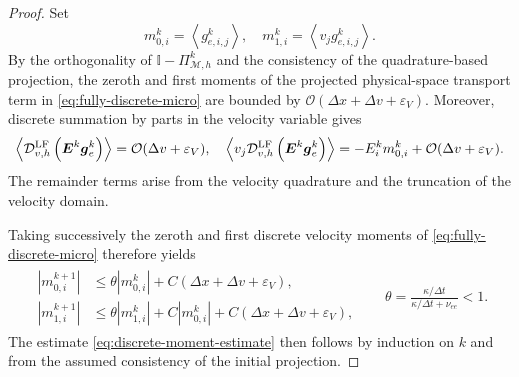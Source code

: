 \documentclass[pdflatex,final,10pt]{article}
\newcommand{\Del}[1]{#1}
\begin{document}
\begin{proof}
Set
\begin{equation*}
    m_{0,i}^{k}
    =
    \left\langle g_{e,i,j}^{k}\right\rangle,
    \quad
    m_{1,i}^{k}
    =
    \left\langle v_jg_{e,i,j}^{k}\right\rangle.
\end{equation*}
By the orthogonality of
$\mathbb{I}-\Pi_{\mathcal{M},h}^{k}$ and the consistency of the
quadrature-based projection, the zeroth and first moments of the projected
physical-space transport term in \eqref{eq:fully-discrete-micro} are
bounded by
\Del{$\mathcal{O}(\Delta x+\Delta v+\varepsilon_V)$}.
Moreover, discrete summation by parts in the velocity variable gives
\Del{\begin{equation*}
    \left\langle
        \mathcal{D}_{v,h}^{\rm LF}
        \left(\boldsymbol{E}^{k}\boldsymbol{g}_e^{k}\right)
    \right\rangle
    =
    \mathcal{O}(\Delta v+\varepsilon_V),\quad \left\langle
        v_j\mathcal{D}_{v,h}^{\rm LF}
        \left(\boldsymbol{E}^{k}\boldsymbol{g}_e^{k}\right)
    \right\rangle
    =
    -E_i^k m_{0,i}^{k}
    +
    \mathcal{O}(\Delta v+\varepsilon_V).
\end{equation*}}
The remainder terms arise from the velocity quadrature and the truncation
of the velocity domain.

Taking successively the zeroth and first discrete velocity moments of
\eqref{eq:fully-discrete-micro} therefore yields
\Del{\begin{align*}
    \begin{aligned}
        |m_{0,i}^{k+1}|
    &\leq
    \theta |m_{0,i}^{k}|
    +
    C\left(\Delta x+\Delta v+\varepsilon_V\right),\\
    |m_{1,i}^{k+1}|
    &\leq
    \theta |m_{1,i}^{k}|
    +
    C|m_{0,i}^{k}|
    +
    C\left(\Delta x+\Delta v+\varepsilon_V\right),
    \end{aligned}
    & \quad \theta
    =
    \frac{\kappa/\Delta t}
    {\kappa/\Delta t+\nu_{ee}}
    <1.
\end{align*}}
The estimate \eqref{eq:discrete-moment-estimate} then follows by induction
on $k$ and from the assumed consistency of the initial projection.
\end{proof}
\end{document}
